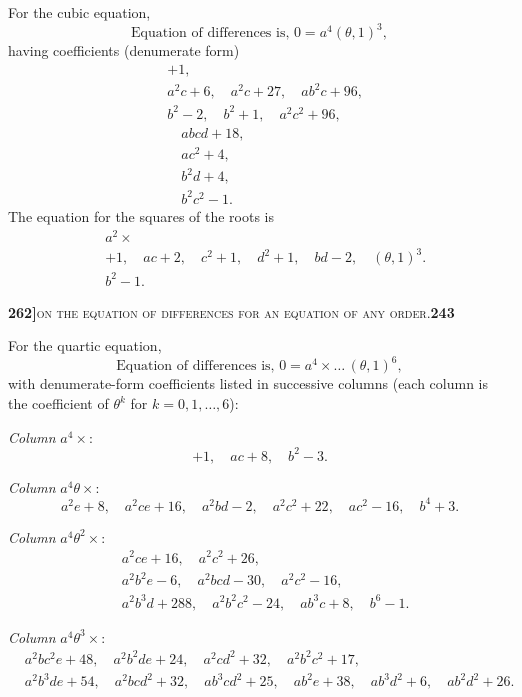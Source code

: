 \documentclass[11pt]{article}
\begin{document}
\medskip

\noindent For the cubic equation,
\[
  \text{Equation of differences is, } 0 = a^4(\theta, 1)^3,
\]
having coefficients (denumerate form)
\[
\begin{aligned}
  &+1,\\
  &a^2 c + 6,\quad a^2 c + 27,\quad ab^2 c + 96,\\
  &b^2 - 2,\quad b^2 + 1,\quad a^2 c^2 + 96,\\
  &\quad abcd + 18,\\
  &\quad ac^2 + 4,\\
  &\quad b^2 d + 4,\\
  &\quad b^2 c^2 - 1.
\end{aligned}
\]
The equation for the squares of the roots is
\[
\begin{aligned}
  & a^2 \times\\
  & +1,\quad ac + 2,\quad c^2 + 1,\quad d^2 + 1,\quad bd - 2,\quad (\theta, 1)^3.\\
  & b^2 - 1.
\end{aligned}
\]

\newpage
\noindent\textbf{262]}\hfill\textsc{on the equation of differences for an equation of any order.}\hfill\textbf{243}

\medskip

\noindent For the quartic equation,
\[
  \text{Equation of differences is, } 0 = a^4 \times \ldots\, (\theta, 1)^6,
\]
with denumerate-form coefficients listed in successive columns (each column is the coefficient of $\theta^k$ for $k = 0, 1, \ldots, 6$):
\medskip

\noindent\textit{Column } $a^4 \times$:
\[
  +1,\quad ac + 8,\quad b^2 - 3.
\]

\noindent\textit{Column } $a^4 \theta \times$:
\[
  a^2 e + 8,\quad a^2 ce + 16,\quad a^2 b d - 2,\quad a^2 c^2 + 22,\quad a c^2 - 16,\quad b^4 + 3.
\]

\noindent\textit{Column } $a^4 \theta^2 \times$:
\[
\begin{aligned}
  & a^2 ce + 16,\quad a^2 c^2 + 26,\\
  & a^2 b^2 e - 6,\quad a^2 b c d - 30,\quad a^2 c^2 - 16,\\
  & a^2 b^3 d + 288,\quad a^2 b^2 c^2 - 24,\quad a b^3 c + 8,\quad b^6 - 1.
\end{aligned}
\]

\noindent\textit{Column } $a^4 \theta^3 \times$:
\[
\begin{aligned}
  & a^2 b c^2 e + 48,\quad a^2 b^2 d e + 24,\quad a^2 c d^2 + 32,\quad a^2 b^2 c^2 + 17,\\
  & a^2 b^3 d e + 54,\quad a^2 b c d^2 + 32,\quad a b^3 c d^2 + 25,\quad a b^2 e + 38,\quad a b^3 d^2 + 6,\quad a b^2 d^2 + 26.
\end{aligned}
\]
\end{document}
